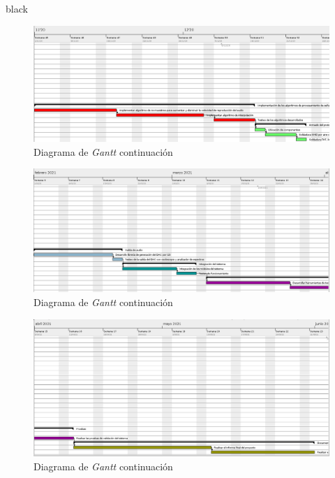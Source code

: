 \documentclass[11pt]{charter}
\begin{document}
\begin{consigna}{black}
\begin{landscape}
\begin{figure}[H]
\centering 
\includegraphics[width=1.5\textwidth]{./Figuras/gant5.png}
\caption{Diagrama de \textit{Gantt} continuación}
\label{fig:gant5}
\end{figure}
\begin{figure}[H]
\centering 
\includegraphics[width=1.5\textwidth]{./Figuras/gant6.png}
\caption{Diagrama de \textit{Gantt} continuación}
\label{fig:gant6}
\end{figure}
\begin{figure}[H]
\centering 
\includegraphics[width=1.5\textwidth]{./Figuras/gant7.png}
\caption{Diagrama de \textit{Gantt} continuación}
\label{fig:gant7}
\end{figure}
\end{landscape}
\end{consigna}
\end{document}
